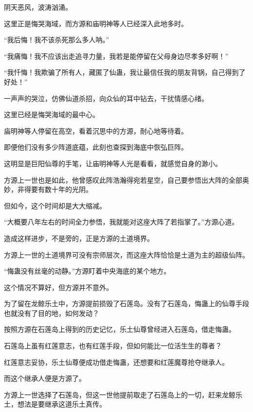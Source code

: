 
\begin{this_body}



阴天恶风，波涛汹涌。

这里正是悔哭海域，而方源和庙明神等人已经深入此地多时。

“我后悔！我不该杀死那么多人呐。”

“我痛悔！我不应该出走追寻力量，我若是能停留在父母身边尽孝多好啊！”

“我忏悔！我欺骗了所有人，藏匿了仙蛊，我让最信任我的朋友背锅，自己得到了好处！”

一声声的哭泣，仿佛仙道杀招，向众仙的耳中钻去，干扰情感心绪。

这里已经是悔哭海域的最中心。

庙明神等人停留在高空，看着沉思中的方源，耐心地等待着。

即便他们没有多少阵道底蕴，此刻也查探到海底中恢弘巨阵。

这明显是巨阳仙尊的手笔，让庙明神等人光是看看，就感觉自身的渺小。

方源上一世也是如此，他曾感叹此阵浩瀚得宛若星空，自己要参悟出大阵的全部奥妙，非得要有数十年的光阴。

但如今，这个时间却是大大缩减。

“大概要八年左右的时间全力参悟，我就能对这座大阵了若指掌了。”方源心道。

造成这样进步，不是旁的，正是方源的土道境界。

方源上一世的土道境界可没有宗师层次，而这座大阵恰恰是土道为主的超级仙阵。

“悔蛊没有丝毫的动静。”方源盯着中央海底的某个地方。

这个情况不算好，但方源并不意外。

为了留在龙鲸乐土中，方源提前损毁了石莲岛。没有了石莲岛，悔蛊上的仙尊手段也就没有了目的地，如何发动？

按照方源在石莲岛上得到的历史记忆，乐土仙尊曾经进入石莲岛，借走悔蛊。

石莲岛上虽有红莲意志，也有红莲手段，但如何能比一位活生生的尊者？

红莲意志妥协，乐土仙尊便成功借走悔蛊，还想要和红莲魔尊抢夺继承人。

而这个继承人便是方源了。

方源上一世选择了石莲岛，但这一世他提前取走了石莲岛上的一切，赶来龙鲸乐土，想法是要继承这道乐土真传。


\end{this_body}
